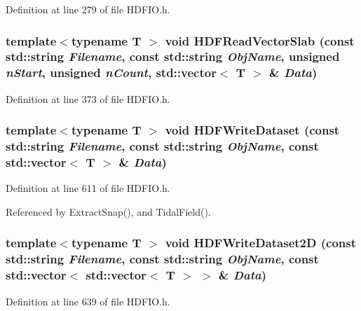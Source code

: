 Definition at line 279 of file HDFIO.h.

\subsubsection[{HDFReadVectorSlab}]{\setlength{\rightskip}{0pt plus 5cm}template$<$typename T $>$ void HDFReadVectorSlab (const std::string {\em Filename}, \/  const std::string {\em ObjName}, \/  unsigned {\em nStart}, \/  unsigned {\em nCount}, \/  std::vector$<$ T $>$ \& {\em Data})}\label{HDFIO_8h_a3a874f1791e49402424d5067b1d42182}


Definition at line 373 of file HDFIO.h.

\subsubsection[{HDFWriteDataset}]{\setlength{\rightskip}{0pt plus 5cm}template$<$typename T $>$ void HDFWriteDataset (const std::string {\em Filename}, \/  const std::string {\em ObjName}, \/  const std::vector$<$ T $>$ \& {\em Data})}\label{HDFIO_8h_aa73a8d13c03b62b0a709d7e7248f0ca7}


Definition at line 611 of file HDFIO.h.



Referenced by ExtractSnap(), and TidalField().

\subsubsection[{HDFWriteDataset2D}]{\setlength{\rightskip}{0pt plus 5cm}template$<$typename T $>$ void HDFWriteDataset2D (const std::string {\em Filename}, \/  const std::string {\em ObjName}, \/  const std::vector$<$ std::vector$<$ T $>$ $>$ \& {\em Data})}\label{HDFIO_8h_a913817631ba066e8204abbacb6eb6b9f}


Definition at line 639 of file HDFIO.h.



